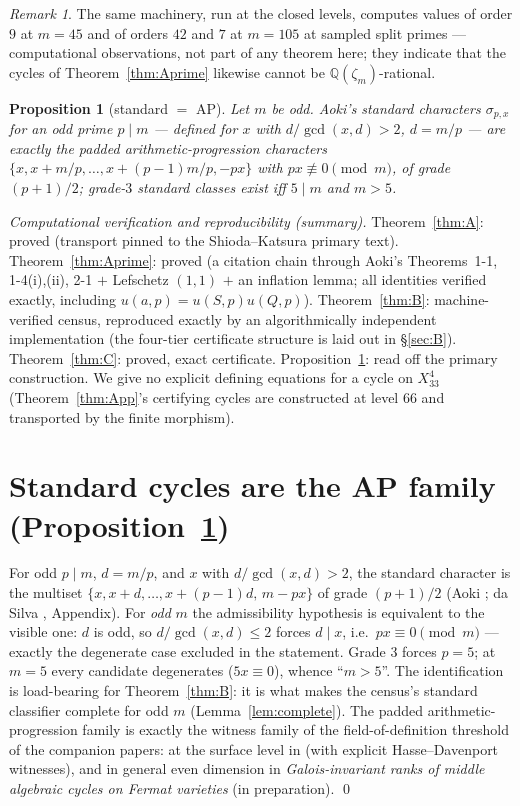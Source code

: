 \documentclass[11pt]{amsart}
\newtheorem{proposition}[theorem]{Proposition}
\theoremstyle{remark}
\newtheorem{remark}[theorem]{Remark}
\newcommand{\Q}{\mathbb{Q}}
\newcommand{\zt}{\zeta}
\begin{document}
\begin{remark}
The same machinery, run at the closed levels, computes values of order $9$ at $m=45$ and of
orders $42$ and $7$ at $m=105$ at sampled split primes --- computational observations, not part
of any theorem here; they indicate that the cycles of Theorem~\ref{thm:Aprime} likewise cannot
be $\Q(\zt_m)$-rational.
\end{remark}

\begin{proposition}[standard $=$ AP]\label{prop:D}
Let $m$ be odd. Aoki's standard characters $\sigma_{p,x}$ for an odd prime $p\mid m$ --- defined for
$x$ with $d/\gcd(x,d)>2$, $d=m/p$ \cite[\S1]{Aoki87} --- are exactly the padded arithmetic-progression
characters $\{x,x+m/p,\dots,x+(p-1)m/p,-px\}$ with $px\not\equiv0\pmod m$, of grade $(p+1)/2$;
grade-$3$ standard classes exist iff $5\mid m$ and $m>5$.
\end{proposition}

\medskip
\noindent\emph{Computational verification and reproducibility (summary).} Theorem~\ref{thm:A}: proved (transport pinned to the Shioda--Katsura
primary text). Theorem~\ref{thm:Aprime}: proved (a citation chain through Aoki's
Theorems~1-1, 1-4(i),(ii), 2-1 \cite{Aoki87} $+$ Lefschetz $(1,1)$ $+$ an inflation lemma; all
identities verified exactly, including $u(a,p)=u(S,p)u(Q,p)$).
Theorem~\ref{thm:B}: machine-verified census, reproduced exactly by an algorithmically
independent implementation (the four-tier certificate structure is laid out in \S\ref{sec:B}).
Theorem~\ref{thm:C}: proved, exact certificate. Proposition~\ref{prop:D}:
read off the primary construction. We give no explicit defining equations for a cycle on $X^4_{33}$
(Theorem~\ref{thm:App}'s certifying cycles are constructed at level $66$ and transported by the finite
morphism).

\section{Standard cycles are the AP family (Proposition~\ref{prop:D})}\label{sec:D}
For odd $p\mid m$, $d=m/p$, and $x$ with $d/\gcd(x,d)>2$, the standard character is the multiset
$\{x,x+d,\dots,x+(p-1)d,\,m-px\}$ of grade $(p+1)/2$ (Aoki \cite[\S1]{Aoki87}; da Silva \cite{daSilva},
Appendix). For \emph{odd} $m$ the admissibility hypothesis is equivalent to the visible one:
$d$ is odd, so $d/\gcd(x,d)\le2$ forces $d\mid x$, i.e.\ $px\equiv0\pmod m$ --- exactly the degenerate
case excluded in the statement. Grade $3$ forces $p=5$; at $m=5$ every candidate degenerates
($5x\equiv0$), whence ``$m>5$''. The identification is load-bearing for
Theorem~\ref{thm:B}: it is what makes the census's standard classifier complete for odd $m$
(Lemma~\ref{lem:complete}).
The padded arithmetic-progression family is exactly the witness family of the field-of-definition
threshold of the companion papers: at the surface level in \cite{P1} (with explicit Hasse--Davenport
witnesses), and in general even dimension in \emph{Galois-invariant ranks of middle algebraic cycles
on Fermat varieties} (in preparation). \qed
\end{document}
